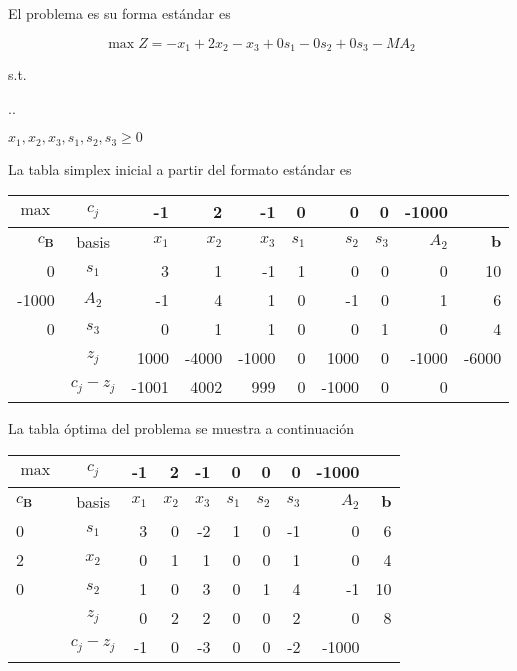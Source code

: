 \begin{solution}

  El problema es su forma estándar es

  \[ \max Z = -x_1 + 2x_2 - x_3 + 0s_1 - 0s_2 + 0s_3 - MA_2\]
  
{\centering
\vspace{2mm}
s.t.
\vspace{2mm}

%
\sysdelim..%

\vspace{4mm}
$x_1, x_2, x_3, s_1, s_2, s_3 \geq 0$
\par}

La tabla simplex inicial a partir del formato estándar es 

{    \centering
    \begin{tabular}{rcrrrrrrrr}
\toprule    
        $\max$ & $c_j$ & -1 & 2 & -1 & 0 & 0 & 0 & -1000 & ~ \\ \midrule
        $c_{\boldsymbol{B}}$ & basis & $x_1$ & $x_2$ & $x_3$ & $s_1$ & $s_2$ & $s_3$ & $A_2$ & $\boldsymbol{b}$ \\ \midrule
        0 & $s_1$ &  3 & 1 & -1 & 1 &  0 & 0 &  0 & 10 \\ 
    -1000 & $A_2$ & -1 & 4 &  1 & 0 & -1 & 0 &  1 &  6\\ 
        0 & $s_3$ &  0 & 1 &  1 & 0 &  0 & 1 &  0 &  4 \\ \midrule
        ~ & $z_j$ & 1000 & -4000 & -1000 & 0 & 1000 & 0 & -1000 & -6000 \\ 
        ~ & $c_j - z_j$ & -1001 & 4002 & 999 & 0 & -1000 & 0 & 0 \\ \toprule
    \end{tabular} \par}


\vspace{1cm}
  La tabla óptima del problema se muestra a continuación 

 
{    \centering
    \begin{tabular}{lcrrrrrrrr}
\toprule    
        $\max$ & $c_j$ & -1 & 2 & -1 & 0 & 0 & 0 & -1000 & ~ \\ \midrule
        $c_{\boldsymbol{B}}$ & basis & $x_1$ & $x_2$ & $x_3$ & $s_1$ & $s_2$ & $s_3$ & $A_2$ & $\boldsymbol{b}$ \\ \midrule
        0 & $s_1$ & 3 & 0 & -2 & 1 & 0 & -1 & 0 & 6 \\ 
        2 & $x_2$ & 0 & 1 & 1 & 0 & 0 & 1 & 0 & 4 \\ 
        0 & $s_2$ & 1 & 0 & 3 & 0 & 1 & 4 & -1 & 10 \\ \midrule
        ~ & $z_j$ & 0 & 2 & 2 & 0 & 0 & 2 & 0 & 8 \\ 
        ~ & $c_j - z_j$ & -1 & 0 & -3 & 0 & 0 & -2 & -1000 \\ \toprule
    \end{tabular} \par}


\end{solution}
